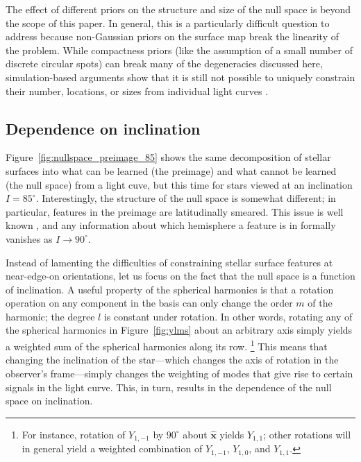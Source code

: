 \documentclass[modern]{aastex62}
\begin{document}
The effect of different priors on the structure and size of the null
space is beyond the scope of this paper. In general, this is a particularly
difficult question to address because non-Gaussian priors on the
surface map break the linearity of the problem. While compactness priors
(like the assumption of a small number of discrete circular spots) can
break many of the degeneracies discussed here, simulation-based
arguments show that it is still not possible to uniquely constrain
their number, locations, or sizes from individual light curves
\citep{Basri2020}.


\subsection{Dependence on inclination}
\label{sec:inclination}

Figure~\ref{fig:nullspace_preimage_85} shows the same decomposition
of stellar surfaces into what can be learned (the preimage) and what
cannot be learned (the null space) from a light cuve, but this time
for stars viewed at an inclination $I = 85^\circ$. Interestingly,
the structure of the null space is somewhat different; in particular,
features in the preimage are latitudinally smeared. This
issue is well known \citep[e.g.,][]{Cowan2009,Basri2020}, and any
information about which hemisphere a feature is in formally vanishes
as $I \rightarrow 90^\circ$.

Instead of lamenting the difficulties of constraining stellar surface features
at near-edge-on orientations, let us focus on the fact that the
null space is a function of inclination.
%
A useful property of
the spherical harmonics is that a rotation operation on any
component in the basis can only change the order $m$ of the
harmonic; the degree $l$ is constant under rotation. In other
words, rotating any of the spherical harmonics in Figure~\ref{fig:ylms}
about an arbitrary axis simply yields a weighted sum of the spherical
harmonics along its row.%
\footnote{For instance, rotation of $Y_{1,-1}$ by $90^\circ$ about
    $\hat{\mathbf{x}}$ yields $Y_{1,1}$; other rotations will in general
    yield a weighted combination of $Y_{1,-1}$, $Y_{1,0}$, and $Y_{1,1}$.}
This means that changing the inclination of the star---which changes
the axis of rotation in the observer's frame---simply changes the weighting
of modes that give rise to certain signals in the light curve.
This, in turn, results in the dependence of the null space on inclination.
\end{document}
